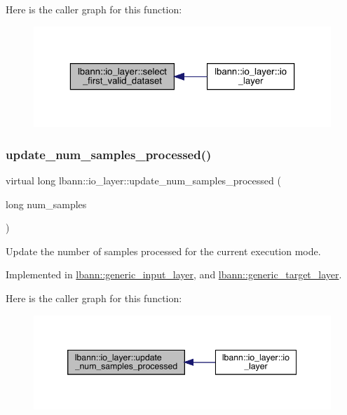 Here is the caller graph for this function\+:\nopagebreak
\begin{figure}[H]
\begin{center}
\leavevmode
\includegraphics[width=323pt]{classlbann_1_1io__layer_a7dbc671fd5a81094854a4d865f7631ce_icgraph}
\end{center}
\end{figure}
\mbox{\label{classlbann_1_1io__layer_a4ed831842ad78aaebfc9519c51268b95}} 
\subsubsection{\texorpdfstring{update\+\_\+num\+\_\+samples\+\_\+processed()}{update\_num\_samples\_processed()}}
{\footnotesize\ttfamily virtual long lbann\+::io\+\_\+layer\+::update\+\_\+num\+\_\+samples\+\_\+processed (\begin{DoxyParamCaption}\item[{long}]{num\+\_\+samples }\end{DoxyParamCaption})\hspace{0.3cm}{\ttfamily [pure virtual]}}

Update the number of samples processed for the current execution mode. 

Implemented in \hyperlink{classlbann_1_1generic__input__layer_a0c2f123432ec6af168012cc8699a1d3f}{lbann\+::generic\+\_\+input\+\_\+layer}, and \hyperlink{classlbann_1_1generic__target__layer_a0dbe5fc5203e15ddcf8348daf2f697c5}{lbann\+::generic\+\_\+target\+\_\+layer}.

Here is the caller graph for this function\+:\nopagebreak
\begin{figure}[H]
\begin{center}
\leavevmode
\includegraphics[width=346pt]{classlbann_1_1io__layer_a4ed831842ad78aaebfc9519c51268b95_icgraph}
\end{center}
\end{figure}


